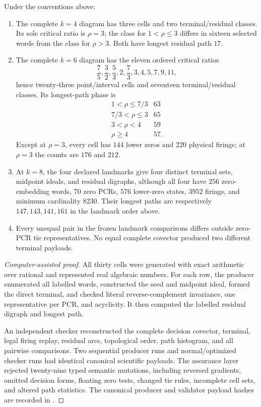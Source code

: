 \begin{proposition}
\label{prop:finite-atlas}
Under the conventions above:
\begin{enumerate}
  \item The complete $k=4$ diagram has three cells and two terminal/residual
        classes.  Its sole critical ratio is $\rho=3$; the class for
        $1<\rho\le3$ differs in sixteen selected words from the class for
        $\rho>3$.  Both have longest residual path $17$.
  \item The complete $k=6$ diagram has the eleven ordered critical ratios
  \[
    \frac75,\frac32,\frac53,2,\frac73,3,4,5,7,9,11,
  \]
  hence twenty-three point/interval cells and seventeen terminal/residual
  classes.  Its longest-path phase is
  \[
    \begin{array}{c|c}
    1<\rho\le7/3 & 63\\
    7/3<\rho\le3 & 65\\
    3<\rho<4 & 59\\
    \rho\ge4 & 57.
    \end{array}
  \]
  Except at $\rho=3$, every cell has $144$ lower zeros and $220$ physical
  firings; at $\rho=3$ the counts are $176$ and $212$.
  \item At $k=8$, the four declared landmarks give four distinct terminal
        sets, midpoint ideals, and residual digraphs, although all four have
        $256$ zero-embedding words, $70$ zero PCRs, $576$ lower-zero states,
        $3952$ firings, and minimum cardinality $8230$.  Their longest paths
        are respectively $147,143,141,161$ in the landmark order above.
  \item Every unequal pair in the frozen landmark comparisons differs outside
        zero-PCR tie representatives.  No equal complete covector produced
        two different terminal payloads.
\end{enumerate}
\end{proposition}

\begin{proof}[Computer-assisted proof]
All thirty cells were generated with exact arithmetic over rational and
represented real algebraic numbers.  For each row, the producer enumerated all labelled words,
constructed the seed and midpoint ideal, formed the direct terminal, and
checked literal reverse-complement invariance, one representative per PCR,
and acyclicity.  It then computed the labelled residual digraph and longest
path.

An independent checker reconstructed the complete decision covector,
terminal, legal firing replay, residual arcs, topological order, path
histogram, and all pairwise comparisons.  Two sequential producer runs and
normal/optimized checker runs had identical canonical scientific payloads.
The assurance layer rejected twenty-nine typed semantic mutations, including
reversed gradients, omitted decision forms, floating zero tests, changed tie
rules, incomplete cell sets, and altered path statistics.  The canonical
producer and validator payload hashes are recorded in
.
\end{proof}

